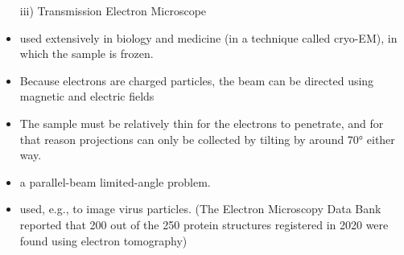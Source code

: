 \documentclass{beamer}
\begin{document}
\begin{frame}
	\begin{itemize}	
		\item[iii)] Transmission Electron Microscope
		\item used extensively in biology and medicine (in a technique called cryo-EM), in which the sample is frozen.
		\item Because electrons are charged particles, the beam can be directed using magnetic and electric fields
		 \pause
\item The sample must be relatively thin for the electrons to penetrate, and for that reason projections can only be collected by tilting
by around 70° either way. 
		\item a parallel-beam limited-angle problem.
		 \pause
 \item used, e.g., to image virus particles. (The Electron Microscopy Data Bank reported that 200 out of the 250 protein structures
registered in 2020 were found using electron tomography)
	\end{itemize}
	\end{frame}
\end{document}
